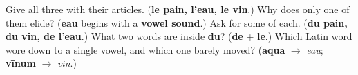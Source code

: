 \begin{tcolorbox}[breakable,colback=teal!4,colframe=teal!35!black,title={Before you move on}]
Give all three with their articles. (\textbf{le pain, l'eau, le vin}.) Why does only one of them elide? (\textbf{eau} begins with a \textbf{vowel sound}.) Ask for some of each. (\textbf{du pain, du vin, de l'eau}.) What two words are inside \textbf{du}? (\textbf{de} + \textbf{le}.) Which Latin word wore down to a single vowel, and which one barely moved? (\textbf{aqua} $\to$ \emph{eau}; \textbf{vīnum} $\to$ \emph{vin}.)
\end{tcolorbox}
